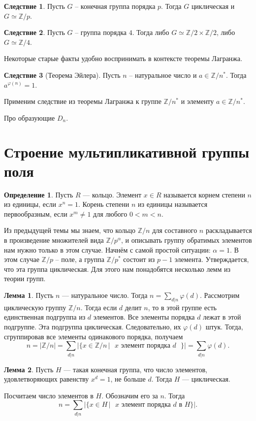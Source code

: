 \documentclass[10pt,a4paper,oneside]{book}
\theoremstyle{definition}
\newtheorem*{defn}{\color{yellow!30!red} Определение}
\newtheorem{lem}{\color{green!50!black}Лемма}
\newtheorem{cor}{\color{green!45!black}Следствие}
\newcommand{\mb}[1]{\mathbb{#1}}
\def\ffi{\varphi}
\def\dfn{\begin{defn}}
\def\edfn{\end{defn}}
\def\lm{\begin{lem}}
\def\elm{\end{lem}}
\def\crl{\begin{cor}}
\def\ecrl{\end{cor}}
\begin{document}
\crl Пусть $G$ -- конечная группа порядка $p$. Тогда $G$ циклическая и $G \simeq \mb Z/p$. 
\ecrl

\crl Пусть $G$ -- группа порядка $4$. Тогда либо $G \simeq \mb Z/2 \times \mb Z/2$, либо $G \simeq \mb Z/4$.
\ecrl



Некоторые старые факты удобно воспринимать в контексте теоремы Лагранжа.


\crl[Теорема Эйлера] Пусть $n$ -- натуральное число и $a\in \mb Z/n^*$. Тогда $a^{\ffi(n)}=1$.
\ecrl
\proof
Применим следствие из теоремы Лагранжа к группе $\mb Z/n^*$ и элементу $a\in \mb Z/n^*$.
\endproof

Про образующие $D_n$.




\section{Строение мультипликативной группы поля}

\dfn Пусть $R$ --- кольцо. Элемент $x\in R$ называется корнем степени $n$ из единицы, если $x^n=1$. Корень
степени $n$ из единицы называется первообразным, если $x^m\neq 1$ для любого $0<m<n$.
\edfn




Из предыдущей темы мы знаем, что кольцо $\mb Z/n$ для составного $n$ раскладывается в произведение множителей вида $\mb Z/p^{\alpha}$, и описывать группу обратимых элементов нам нужно только в этом случае. Начнём с самой простой ситуации: $\alpha=1$. В этом случае $\mb Z/p$ -- поле, а группа $\mb Z/p^*$ состоит из $p-1$ элемента. Утверждается, что эта группа циклическая. Для этого нам понадобятся несколько лемм из теории групп. 

\lm Пусть $n$ --- натуральное число. Тогда $n = \sum_{d|n}\varphi(d)$.
\proof  Рассмотрим циклическую группу $\mb Z/n$. Тогда если $d$ делит $n$, то в этой группе есть единственная подгруппа из $d$ элементов. Все элементы порядка $d$ лежат в этой подгруппе. Эта подгруппа циклическая. Следовательно, их $\ffi(d)$ штук. Тогда, сгруппировав все элементы одинакового порядка, получаем
$$n= |\mb Z/n |= \sum_{d|n} |\{ x \in \mb Z/n \,| \text{ $x$ элемент порядка $d$  }\}| = \sum_{d|n}\varphi(d).$$
\endproof
\elm

\lm Пусть $H$ --- такая конечная группа, что число элементов, удовлетворяющих равенству $x^d= 1$, не больше $d$. Тогда $H$ --- циклическая.
\elm
\proof Посчитаем число элементов в $H$. Обозначим его за $n$. Тогда
$$ n = \sum_{d|n} |\{ x \in H \,|\text{  $x$ элемент порядка $d$ в $H$} \}|.$$
\end{document}
